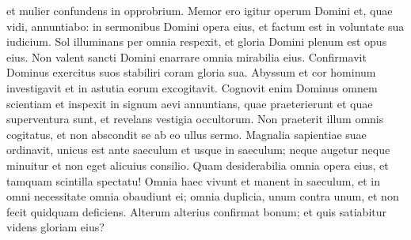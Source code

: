 \begin{biblechapter}
\begin{biblechapter}
\begin{biblechapter}
\begin{biblechapter}
\begin{biblechapter}
\begin{biblechapter}
\begin{biblechapter}
\begin{biblechapter}
\begin{biblechapter}
\begin{biblechapter}
\begin{biblechapter}
\begin{biblechapter}
\begin{biblechapter}
\begin{biblechapter}
\begin{biblechapter}
\begin{biblechapter}
\begin{biblechapter}
\begin{biblechapter}
\begin{biblechapter}
\begin{biblechapter}
\begin{biblechapter}
\begin{biblechapter}
\begin{biblechapter}
\begin{biblechapter}
\begin{biblechapter}
\begin{biblechapter}
\begin{biblechapter}
\begin{biblechapter}
\begin{biblechapter}
\begin{biblechapter}
\begin{biblechapter}
\begin{biblechapter}
\begin{biblechapter}
\begin{biblechapter}
\begin{biblechapter}
\begin{biblechapter}
\begin{biblechapter}
\begin{biblechapter}
\begin{biblechapter}
\begin{biblechapter}
\begin{biblechapter}
\begin{biblechapter}
 et mulier confundens in opprobrium.
 \verse Memor ero igitur operum Domini
 et, quae vidi, annuntiabo:
 in sermonibus Domini opera eius,
 et factum est in voluntate sua iudicium.
 \verse Sol illuminans per omnia respexit,
 et gloria Domini plenum est opus eius.
 \verse Non valent sancti Domini
 enarrare omnia mirabilia eius.
 Confirmavit Dominus exercitus suos
 stabiliri coram gloria sua.
 \verse Abyssum et cor hominum investigavit
 et in astutia eorum excogitavit.
 \verse Cognovit enim Dominus omnem scientiam
 et inspexit in signum aevi
 annuntians, quae praeterierunt et quae superventura sunt,
 et revelans vestigia occultorum.
 \verse Non praeterit illum omnis cogitatus,
 et non abscondit se ab eo ullus sermo.
 \verse Magnalia sapientiae suae ordinavit,
 unicus est ante saeculum et usque in saeculum;
 neque augetur 
\verse neque minuitur
 et non eget alicuius consilio.
 \verse Quam desiderabilia omnia opera eius,
 et tamquam scintilla spectatu!
 \verse Omnia haec vivunt et manent in saeculum,
 et in omni necessitate omnia obaudiunt ei;
 \verse omnia duplicia, unum contra unum,
 et non fecit quidquam deficiens.
 \verse Alterum alterius confirmat bonum;
 et quis satiabitur videns gloriam eius?
 

\end{biblechapter}
\end{biblechapter}
\end{biblechapter}
\end{biblechapter}
\end{biblechapter}
\end{biblechapter}
\end{biblechapter}
\end{biblechapter}
\end{biblechapter}
\end{biblechapter}
\end{biblechapter}
\end{biblechapter}
\end{biblechapter}
\end{biblechapter}
\end{biblechapter}
\end{biblechapter}
\end{biblechapter}
\end{biblechapter}
\end{biblechapter}
\end{biblechapter}
\end{biblechapter}
\end{biblechapter}
\end{biblechapter}
\end{biblechapter}
\end{biblechapter}
\end{biblechapter}
\end{biblechapter}
\end{biblechapter}
\end{biblechapter}
\end{biblechapter}
\end{biblechapter}
\end{biblechapter}
\end{biblechapter}
\end{biblechapter}
\end{biblechapter}
\end{biblechapter}
\end{biblechapter}
\end{biblechapter}
\end{biblechapter}
\end{biblechapter}
\end{biblechapter}
\end{biblechapter}
